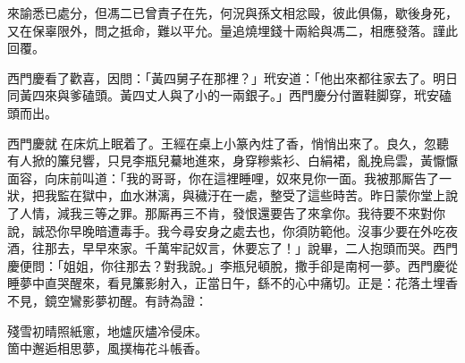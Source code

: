 \begin{myquote}[\markfont]
來諭悉已處分，但馮二已曾責子在先，何況與孫文相忿毆，彼此俱傷，歇後身死，又在保辜限外，問之抵命，難以平允。量追燒埋錢十兩給與馮二，相應發落。謹此回覆。

\end{myquote}

西門慶看了歡喜，因問：「黃四舅子在那裡？」玳安道：「他出來都往家去了。明日同黃四來與爹磕頭。黃四丈人與了小的一兩銀子。」西門慶分付置鞋脚穿，玳安磕頭而出。

西門慶就𢱉在床炕上眠着了。王經在桌上小篆內炷了香，悄悄出來了。良久，忽聽有人掀的簾兒響，只見李瓶兒驀地進來，身穿糝紫衫、白絹裙，亂挽烏雲，黃懨懨面容，向床前叫道：「我的哥哥，你在這裡睡哩，奴來見你一面。我被那厮告了一狀，把我監在獄中，血水淋漓，與穢汙在一處，整受了這些時苦。昨日蒙你堂上說了人情，{}減我三等之罪。那厮再三不肯，發恨還要告了來拿你。我待要不來對你說，誠恐你早晚暗遭毒手。{}我今尋安身之處去也，你須防範他。沒事少要在外吃夜酒，往那去，早早來家。千萬牢記奴言，休要忘了！」說畢，二人抱頭而哭。西門慶便問：「姐姐，你往那去？對我說。」李瓶兒頓脫，撒手卻是南柯一夢。西門慶從睡夢中直哭醒來，看見簾影射入，正當日午，繇不的心中痛切。正是：花落土埋香不見，鏡空鸞影夢初醒。有詩為證：

\begin{myquote} 
殘雪初晴照紙窻，地爐灰燼冷侵床。\\箇中邂逅相思夢，風撲梅花斗帳香。
\end{myquote} 

